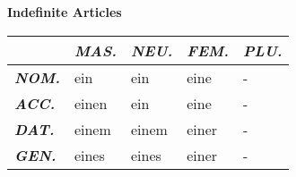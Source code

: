 \documentclass[a4paper,twocolumn,10pt]{article}
\newcommand{\tabularxtable}[3]
{

	\vspace{0.5cm}
	\nolinenumbers

	\begin{tabularx}{#1}{#2}
		#3
	\end{tabularx}

	\linenumbers
	\vspace{0.5cm}
}
\begin{document}
\textbf {Indefinite Articles}
\tabularxtable
{0.99\linewidth}
{l|XXXX}
{

		&
		\cellcolor{table-subtopic} \textbf{\textit{MAS.}} &
		\cellcolor{table-subtopic} \textbf{\textit{NEU.}}  &
		\cellcolor{table-subtopic} \textbf{\textit{FEM.}}  &
		\cellcolor{table-subtopic} \textbf{\textit{PLU.}}\\

\midrule

\cellcolor{table-subtopic} \textbf{\textit{NOM.}} &
\cellcolor{cell-lightpurple}  ein            &
\cellcolor{cell-lightorange}  ein            &
\cellcolor{cell-lightblue} eine              &
\cellcolor{table-bg} - \\

\cellcolor{table-subtopic} \textbf{\textit{ACC.}} &
\cellcolor{cell-lightgreen} einen            &
\cellcolor{cell-lightorange}  ein            &
\cellcolor{cell-lightblue}  eine             &
\cellcolor{table-bg} - \\

\cellcolor{table-subtopic} \textbf{\textit{DAT.}} &
\cellcolor{cell-lightred} einem              &
\cellcolor{cell-lightred} einem              &
\cellcolor{cell-lightpurple} einer           &
\cellcolor{table-bg} - \\

\cellcolor{table-subtopic} \textbf{\textit{GEN.}} &
\cellcolor{cell-lightyellow} eines           &
\cellcolor{cell-lightyellow} eines           &
\cellcolor{cell-lightpurple} einer           &
\cellcolor{table-bg} - \\



}


\end{document}

